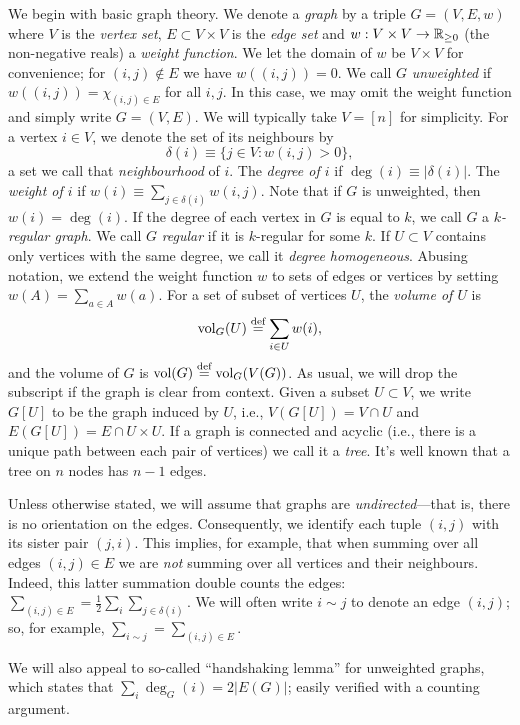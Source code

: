 We begin with basic graph theory. 
We denote a \emph{graph} by a triple $G=(V,E,w)$ where $V$ is the \emph{vertex set}, $E\subset V\times V$ is the \emph{edge set} and $w:V\times V\to\mathbb{R}_{\geq0}$ (the non-negative reals) a \emph{weight function}. We let the domain of $w$ be $V\times V$ for convenience; for $(i,j)\notin E$ we have $w((i,j))=0$. We call $G$ \emph{unweighted} if $w((i,j))=\chi_{(i,j)\in E}$ for all $i,j$. In this case, we may omit the weight function and simply write $G=(V,E)$. 
We will typically take $V=[n]$ for simplicity. For a  vertex $i\in V$, we denote the set of its neighbours by 
\[\delta(i) \equiv  \{j\in V:w(i,j)>0\},\]
a set we call that \emph{neighbourhood} of $i$. The \emph{degree of $i$} if $\deg(i)\equiv |\delta(i)|$. The \emph{weight of $i$} if $w(i)\equiv \sum_{j\in \delta(i)}w(i,j)$. Note that if $G$ is unweighted, then $w(i)=\deg(i)$. If the degree of each vertex in $G$ is equal to $k$, we call $G$ a \emph{$k$-regular graph}. We call $G$ \emph{regular} if it is $k$-regular for some $k$. If $U\subset V$ contains only vertices with the same degree, we call it \emph{degree homogeneous}. 
Abusing notation, we extend the weight function $w$ to sets of edges or vertices by setting $w(A)=\sum_{a\in A}w(a)$. 
For a set of subset of vertices $U$, the \emph{volume of $U$} is 
\[\textnormal{vol}_G(U) \overset{\text{def}}{=} \sum_{i\in U}w(i),\]
and the volume of $G$ is $\textnormal{vol}(G) \overset{\text{def}}{=} \textnormal{vol}_G(V(G))$. As usual, we will drop the subscript if the graph is clear from context. Given a subset $U\subset  V$, we write $G[U]$ to be the graph induced by $U$, i.e., $V(G[U])  = V\cap U$ and  $E(G[U]) = E \cap U \times U$. If a graph is connected  and acyclic (i.e., there is a unique path between each pair of vertices) we call it a \emph{tree}. It's well known that a tree on $n$ nodes has $n-1$ edges.  

Unless otherwise stated, we will assume that graphs are \emph{undirected}---that is, there is no orientation on the edges. Consequently, we identify each tuple $(i,j)$ with its sister pair $(j,i)$. This implies, for example, that when summing over all edges $(i,j)\in E$ we are \emph{not} summing over all vertices and their neighbours. Indeed, this latter summation double counts the edges: $\sum_{(i,j)\in E}=\frac{1}{2}\sum_{i}\sum_{j\in\delta(i)}$. We will often write $i\sim j$ to denote an edge $(i,j)$; so, for example, $\sum_{i\sim j}=\sum_{(i,j)\in E}$. 

We will also appeal to so-called ``handshaking lemma'' for unweighted graphs, which states that $\sum_i \deg_G(i) = 2|E(G)|$; easily verified with a counting argument. 





